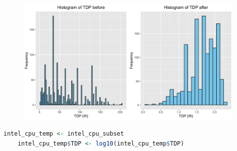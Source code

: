 \begin{figure}[H]
    \begin{center}
    \includegraphics[width=14cm]{graphics/tdp_before_after.png}
    \end{center}
\end{figure}

\begin{lstlisting}[language=R]
    intel_cpu_temp <- intel_cpu_subset
    intel_cpu_temp$TDP <- log10(intel_cpu_temp$TDP)
\end{lstlisting}


\newpage